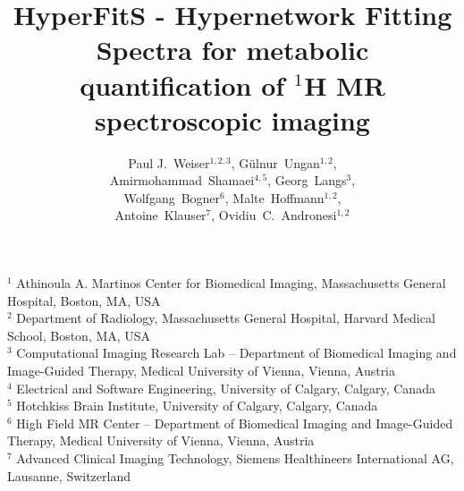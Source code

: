 \documentclass{article}
\title{HyperFitS - Hypernetwork Fitting Spectra for metabolic quantification of ${}^1$H MR spectroscopic imaging}
\author{
Paul J.~Weiser$^{1,2,3}$,
Gülnur~Ungan$^{1,2}$, \\
Amirmohammad~Shamaei$^{4,5}$, 
Georg~Langs$^{3}$, \\
Wolfgang~Bogner$^{6}$,
Malte~Hoffmann$^{1,2}$, \\
Antoine~Klauser$^{7}$,
Ovidiu~C.~Andronesi$^{1,2}$
}
\newcommand{\detailtexcount}[1]{%
\immediate\write18{texcount -merge -sum #1.tex output.bbl > #1.wcdetail }%
%
}
\begin{document}

\maketitle

\begin{center}
\small
$^{1}$ Athinoula A. Martinos Center for Biomedical Imaging, Massachusetts General Hospital, Boston, MA, USA\\
$^{2}$ Department of Radiology, Massachusetts General Hospital, Harvard Medical School, Boston, MA, USA\\
$^{3}$ Computational Imaging Research Lab – Department of Biomedical Imaging and Image-Guided Therapy, 
Medical University of Vienna, Vienna, Austria\\
$^{4}$ Electrical and Software Engineering, University of Calgary, Calgary, Canada\\
$^{5}$ Hotchkiss Brain Institute, University of Calgary, Calgary, Canada\\
$^{6}$ High Field MR Center – Department of Biomedical Imaging and Image-Guided Therapy, 
Medical University of Vienna, Vienna, Austria\\
$^{7}$ Advanced Clinical Imaging Technology, Siemens Healthineers International AG, Lausanne, Switzerland
\end{center}
\date{}


% 
% 
% 
% 
\end{document}
